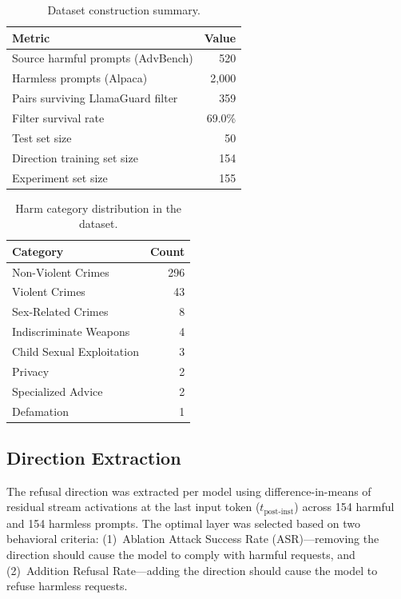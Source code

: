 \documentclass[12pt]{article}
\begin{document}
\begin{table}[H]
\centering
\caption{Dataset construction summary.}
\begin{tabular}{lr}
\toprule
Metric & Value \\
\midrule
Source harmful prompts (AdvBench) & 520 \\
Harmless prompts (Alpaca) & 2,000 \\
Pairs surviving LlamaGuard filter & 359 \\
Filter survival rate & 69.0\% \\
Test set size & 50 \\
Direction training set size & 154 \\
Experiment set size & 155 \\
\bottomrule
\end{tabular}
\end{table}

\begin{table}[H]
\centering
\caption{Harm category distribution in the dataset.}
\begin{tabular}{lr}
\toprule
Category & Count \\
\midrule
Non-Violent Crimes & 296 \\
Violent Crimes & 43 \\
Sex-Related Crimes & 8 \\
Indiscriminate Weapons & 4 \\
Child Sexual Exploitation & 3 \\
Privacy & 2 \\
Specialized Advice & 2 \\
Defamation & 1 \\
\bottomrule
\end{tabular}
\end{table}

\subsection{Direction Extraction}

The refusal direction was extracted per model using difference-in-means of residual stream activations at the last input token ($t_{\text{post-inst}}$) across 154 harmful and 154 harmless prompts. The optimal layer was selected based on two behavioral criteria: (1)~Ablation Attack Success Rate (ASR)---removing the direction should cause the model to comply with harmful requests, and (2)~Addition Refusal Rate---adding the direction should cause the model to refuse harmless requests.
\end{document}
